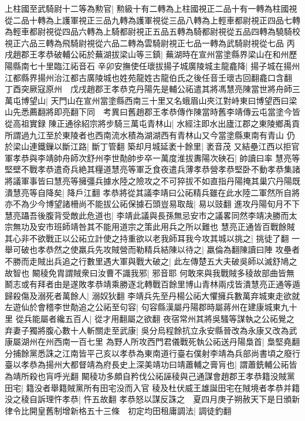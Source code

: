 上柱國至武騎尉十二等為勲官|{
	勲級十有二轉為上柱國視正二品十有一轉為柱國視從二品十轉為上護軍視正三品九轉為護軍視從三品八轉為上輕車都尉視正四品七轉為輕車都尉視從四品六轉為上騎都尉視正五品五轉為騎都尉視從五品四轉為驍騎校視正六品三轉為飛騎尉視從六品二轉為雲騎尉視正七品一轉為武騎尉視從七品}
丙戌趙郡王孝恭破輔公祏於蕪湖拔梁山等三鎮|{
	蕪湖時在宣州當塗縣界梁山在和州歷陽縣南七十里臨江祏音石}
辛卯安撫使任瓌拔揚子城廣陵城主龍龕降|{
	揚子城在揚州江都縣界揚州治江都古廣陵城也姓苑龍姓古龍伯氏之後任音壬瓌古回翻龕口含翻}
丁酉突厥寇原州　戊戌趙郡王孝恭克丹陽先是輔公祏遣其將馮慧亮陳當世將舟師三萬屯博望山|{
	天門山在宣州當塗縣西南三十里又名蛾眉山夾江對峙東曰博望西曰梁山先悉薦翻將即亮翻下同　考異曰舊趙郡王孝恭傳作陳當時舊李靖傳云屯當塗今皆從高祖實録}
陳正通徐紹宗將步騎三萬屯青林山|{
	水經注即水出廬江郡之東陵鄉禹貢所謂過九江至於東陵者也西南流水積為湖湖西有青林山又今當塗縣東南有青山}
仍於梁山連鐵鏁以斷江路|{
	斷丁管翻}
築却月城延袤十餘里|{
	袤音茂}
又結壘江西以拒官軍孝恭與李靖帥舟師次舒州李世勣帥步卒一萬度淮拔夀陽次硤石|{
	帥讀曰率}
慧亮等堅壁不戰孝恭遣奇兵絶其糧道慧亮等軍乏食夜遣兵薄孝恭營孝恭堅卧不動孝恭集諸將議軍事皆曰慧亮等擁彊兵據水陸之險攻之不可猝拔不如直指丹陽掩其巢穴丹陽既潰慧亮等自降矣|{
	降戶江翻}
孝恭將從其議李靖曰公祏精兵雖在此水陸二軍然所自將亦不為少今博望諸柵尚不能拔公祏保據石頭豈易取哉|{
	易以豉翻}
進攻丹陽旬月不下慧亮躡吾後腹背受敵此危道也|{
	李靖此議與長孫無忌安市之議畧同然李靖决勝而太宗無功及安市班師靖咎其不能用道宗之策此用兵之所以難也}
慧亮正通皆百戰餘賊其心非不欲戰正以公祏立計使之持重欲以老我師耳我今攻其城以挑之|{
	挑徒了翻}
一舉可破也孝恭然之使羸兵先攻賊營而勒精兵結陳以待之|{
	羸倫為翻陳讀曰陣}
攻壘者不勝而走賊出兵追之行數里遇大軍與戰大破之|{
	此左傳楚五大夫破吳師以滅舒鳩之故智也}
闞稜免胄謂賊衆曰汝曹不識我邪|{
	邪音耶}
何敢來與我戰賊多稜故部曲皆無鬭志或有拜者由是遂敗孝恭靖乘勝逐北轉戰百餘里博山青林兩戍皆潰慧亮正通等遁歸殺傷及溺死者萬餘人|{
	溺奴狄翻}
李靖兵先至丹楊公祏大懼擁兵數萬弃城東走欲就左遊仙於會稽李世勣追之公祏至句容|{
	句容縣漢屬丹陽郡時屬蔣州在建康城東九十里}
從兵能屬者纔五百人|{
	從才用翻屬之欲翻}
夜宿常州其將吳騷等謀執之公祏覺之弃妻子獨將腹心數十人斬關走至武康|{
	吳分烏程餘抗立永安縣晉改為永康又改為武康屬湖州在州西南一百七里}
為野人所攻西門君儀戰死執公祏送丹陽梟首|{
	梟堅堯翻}
分捕餘黨悉誅之江南皆平己亥以孝恭為東南道行臺右僕射李靖為兵部尚書頃之廢行臺以孝恭為揚州大都督靖為府長史上深美靖功曰靖蕭輔之膏肓也|{
	謂蕭銑輔公祏皆為靖所殺也肓呼光翻}
闞稜功多頗自矜伐公祏誣稜與己通謀會趙郡王孝恭籍没賊黨田宅|{
	籍没者舉籍賊黨所有田宅没而入官}
稜及杜伏威王雄誕田宅在賊境者孝恭并籍没之稜自訴理忤孝恭|{
	忤五故翻}
孝恭怒以謀反誅之　夏四月庚子朔赦天下是日頒新律令比開皇舊制增新格五十三條　初定均田租庸調法|{
	調徒釣翻}

